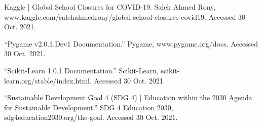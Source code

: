 \documentclass[fontsize=11pt]{article}
\begin{document}
Kaggle | Global School Closures for COVID-19. Saleh Ahmed Rony, www.kaggle.com/salehahmedrony/global-school-closures-covid19. Accessed 30 Oct. 2021.

“Pygame v2.0.1.Dev1 Documentation.” Pygame, www.pygame.org/docs. Accessed 30 Oct. 2021.

“Scikit-Learn 1.0.1 Documentation.” Scikit-Learn, scikit-learn.org/stable/index.html. Accessed 30 Oct. 2021.

“Sustainable Development Goal 4 (SDG 4) | Education within the 2030 Agenda for Sustainable Development.” SDG 4 Education 2030, sdg4education2030.org/the-goal. Accessed 30 Oct. 2021.
\end{document}
